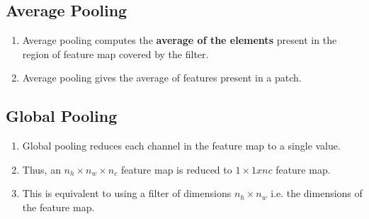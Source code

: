 
\subsection{Average Pooling \cite{gfg-cnn-introduction-to-pooling-layer,dnn-1}} \label{cnn: Average Pooling}
\begin{enumerate}
    \item Average pooling computes the \textbf{average of the elements} present in the region of feature map covered by the filter.
    
    \item Average pooling gives the average of features present in a patch.
\end{enumerate}


\subsection{Global Pooling \cite{gfg-cnn-introduction-to-pooling-layer,dnn-1}} \label{cnn: Global Pooling}
\begin{enumerate}
    \item Global pooling reduces each channel in the feature map to a single value.
    
    \item Thus, an $n_h \times n_w \times n_c$ feature map is reduced to $1 \times 1 x nc$ feature map. 

    \item This is equivalent to using a filter of dimensions $n_h \times n_w$ i.e. the dimensions of the feature map.
\end{enumerate}

